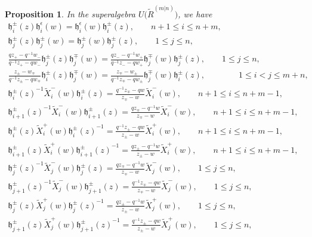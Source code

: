 \documentclass[pdftex]{sigma}
\numberwithin{equation}{section}
\newtheorem{Proposition}[Theorem]{Proposition}
 { \theoremstyle{definition}
\newtheorem{Definition}[Theorem]{Definition}
\newtheorem{Note}[Theorem]{Note}
\newtheorem{Example}[Theorem]{Example}
\newtheorem{Remark}[Theorem]{Remark} }
\begin{document}
\begin{Proposition} In the superalgebra $U\bigl(\widetilde{R}^{(m|n)}\bigr)$, we have
\begin{gather*}
 \mathfrak{h}_i^{\pm}(z)\mathfrak{h}_i^{\epsilon}(w)=\mathfrak{h}_i^{\epsilon}(w)\mathfrak{h}_i^{\pm}(z),\qquad n+1\leq i\leq n+m,\\
 \mathfrak{h}_j^{\pm}(z)\mathfrak{h}_j^{\pm}(w)=\mathfrak{h}_j^{\pm}(w)\mathfrak{h}_j^{\pm}(z),\qquad 1\leq j\leq n,\\
 \frac{qz_+-q^{-1}w_-}{q^{-1}z_+-qw_-}\mathfrak{h}_j^{\pm}(z)\mathfrak{h}_j^{\mp}(w)=\frac{qz_--q^{-1}w_+}{q^{-1}z_--qw_+}\mathfrak{h}_j^{\mp}(w)\mathfrak{h}_j^{\pm}(z),\qquad 1\leq j\leq n,\\
 \frac{z_{\pm}-w_{\mp}}{q^{-1}z_{\pm}-qw_{\mp}}\mathfrak{h}_i^{\pm}(z)\mathfrak{h}_j^{\mp}(w)=\frac{z_{\mp}-w_{\pm}}{q^{-1}z_{\mp}-qw_{\pm}}\mathfrak{h}_j^{\mp}(w)\mathfrak{h}_i^{\pm}(z), \qquad \qquad 1\leq i<j\leq m+n,\\
 {\mathfrak{h}_i^{\pm}(z)}^{-1}\widetilde{X}^-_i(w)\mathfrak{h}_i^{\pm}(z)=\frac{q^{-1}z_{\mp}-qw}{z_{\mp}-w}\widetilde{X}^-_i(w),\qquad n+1\leq i\leq n+m-1,\\
 {\mathfrak{h}_{i+1}^{\pm}(z)}^{-1}\widetilde{X}^-_i(w)\mathfrak{h}_{i+1}^{\pm}(z)=\frac{qz_{\mp}-q^{-1}w}{z_{\mp}-w}\widetilde{X}^-_i(w),\qquad n+1\leq i\leq n+m-1,\\
 \mathfrak{h}_i^{\pm}(z)\widetilde{X}^+_i(w){\mathfrak{h}_i^{\pm}(z)}^{-1}=\frac{q^{-1}z_{\pm}-qw}{z_{\pm}-w}\widetilde{X}^+_i(w),\qquad n+1\leq i\leq n+m-1,\\
 \mathfrak{h}_{i+1}^{\pm}(z)\widetilde{X}^+_i(w){\mathfrak{h}_{i+1}^{\pm}(z)}^{-1}=\frac{qz_{\pm}-q^{-1}w}{z_{\pm}-w}\widetilde{X}^+_i(w),\qquad n+1\leq i\leq n+m-1,\\
 {\mathfrak{h}_j^{\pm}(z)}^{-1}\widetilde{X}^-_j(w)\mathfrak{h}_j^{\pm}(z)=\frac{qz_{\mp}-q^{-1}w}{z_{\mp}-w}\widetilde{X}^-_j(w),\qquad 1\leq j\leq n,\\
 {\mathfrak{h}_{j+1}^{\pm}(z)}^{-1}\widetilde{X}^-_j(w)\mathfrak{h}_{j+1}^{\pm}(z)=\frac{q^{-1}z_{\mp}-qw}{z_{\mp}-w}\widetilde{X}^-_j(w),\qquad 1\leq j\leq n,
\\
 \mathfrak{h}_j^{\pm}(z)\widetilde{X}^+_j(w){\mathfrak{h}_j^{\pm}(z)}^{-1}=\frac{qz_{\pm}-q^{-1}w}{z_{\pm}-w}\widetilde{X}^+_j(w),\qquad 1\leq j\leq n,\\
 \mathfrak{h}_{j+1}^{\pm}(z)\widetilde{X}^+_j(w){\mathfrak{h}_{j+1}^{\pm}(z)}^{-1}=\frac{q^{-1}z_{\pm}-qw}{z_{\pm}-w}\widetilde{X}^+_j(w),\qquad 1\leq j\leq n,\\

\end{gather*}
\end{Proposition}
\end{document}
